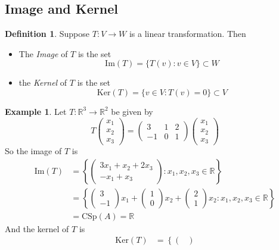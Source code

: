 \documentclass{report}
\theoremstyle{remark}
\theoremstyle{definition}
\newtheorem{definition}[theorem]{Definition}
\theoremstyle{definition}
\newtheorem{example}[theorem]{Example}
\theoremstyle{theorem}
\begin{document}
\subsection{Image and Kernel}
\begin{definition}
Suppose $T:V\rightarrow W$ is a linear transformation. Then
\begin{itemize}
    \item The \emph{Image} of $T$ is the set
    \[\mathrm{Im}(T)= \{T(v):v \in V\} \subset W\]
    \item the \emph{Kernel} of $T$ is the set
    \[\mathrm{Ker}(T)=\{v \in V: T(v)=0\} \subset V\]
\end{itemize}
\end{definition}
\begin{example}
Let $T: \mathbb{R}^3 \rightarrow \mathbb{R}^2$ be given by
\[T\begin{pmatrix}
x_1\\x_2\\x_3
\end{pmatrix} = \begin{pmatrix}
3&1&2\\-1&0&1
\end{pmatrix}\begin{pmatrix}
x_1\\x_2\\x_3
\end{pmatrix}\]
So the image of $T$ is
\begin{align*}
    \mathrm{Im}(T)&=\left\{\begin{pmatrix}
    3x_1+x_2+2x_3\\
    -x_1+x_3
    \end{pmatrix}: x_1,x_2,x_3 \in \mathbb{R}\right\}\\
    &=\left\{\begin{pmatrix}
    3\\-1
    \end{pmatrix}x_1 +\begin{pmatrix}
    1\\0
    \end{pmatrix}x_2+\begin{pmatrix}
    2\\1
    \end{pmatrix}x_2:x_1,x_2,x_3 \in \mathbb{R} \right\}\\
    &= \mathrm{CSp}(A) = \mathbb{R}
\end{align*}
And the kernel of $T$ is
\begin{align*}
    \mathrm{Ker}(T) &= \left\{\begin{pmatrix}

\end{pmatrix}
\end{align*}
\end{example}
\end{document}
